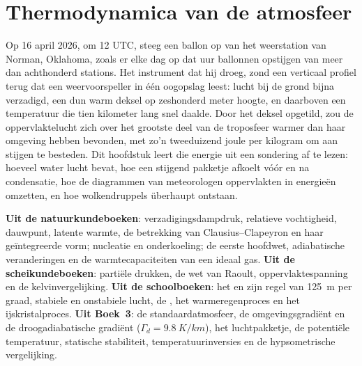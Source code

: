 \chapter{Thermodynamica van de atmosfeer}\label{ch:b2:atmospheric-thermodynamics}

Op 16 april 2026, om 12 UTC, steeg een ballon op van het weerstation van Norman, Oklahoma, zoals
er elke dag op dat uur ballonnen opstijgen van meer dan achthonderd stations. Het instrument dat hij
droeg, zond een verticaal profiel terug dat een weervoorspeller in één oogopslag leest: lucht bij de grond
bijna verzadigd, een dun warm deksel op zeshonderd meter hoogte, en daarboven een temperatuur die
tien kilometer lang snel daalde. Door het deksel opgetild, zou de oppervlaktelucht zich
over het grootste deel van de troposfeer warmer dan haar omgeving hebben bevonden, met zo'n tweeduizend joule per
kilogram om aan stijgen te besteden. Dit hoofdstuk leert die energie uit een sondering af te lezen: hoeveel
water lucht bevat, hoe een stijgend pakketje afkoelt vóór en na condensatie, hoe de diagrammen van
meteorologen oppervlakten in energieën omzetten, en hoe wolkendruppels überhaupt ontstaan.

\begin{recall}
\textbf{Uit de natuurkundeboeken}: verzadigingsdampdruk, relatieve vochtigheid, dauwpunt,
latente warmte, de betrekking van Clausius--Clapeyron en haar geïntegreerde vorm; nucleatie en
onderkoeling; de eerste hoofdwet, adiabatische veranderingen en de warmtecapaciteiten van een ideaal gas.
\textbf{Uit de scheikundeboeken}: partiële drukken, de wet van Raoult, oppervlaktespanning en de
kelvinvergelijking. \textbf{Uit de schoolboeken}: het  en zijn regel van
\qty{125}{m} per graad, stabiele en onstabiele lucht, de , het warmeregenproces en het
ijskristalproces. \textbf{Uit Boek~3}: de standaardatmosfeer, de omgevingsgradiënt
en de droogadiabatische gradiënt ($\Gamma_d = \qty{9.8}{K/km}$), het luchtpakketje, de potentiële
temperatuur, statische stabiliteit, temperatuurinversies en de hypsometrische vergelijking.
\end{recall}

